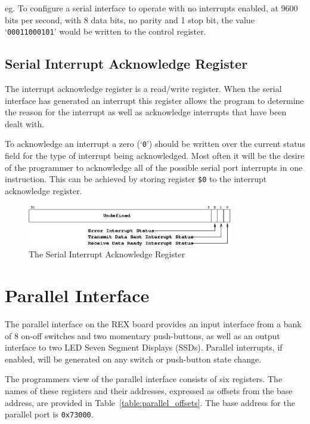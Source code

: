 \documentclass[a4paper,10pt]{article}
\begin{document}
\noindent
eg. To configure a serial interface to operate with no interrupts
enabled, at 9600 bits per second, with 8 data bits, no parity and 1
stop bit, the value `\texttt{00011000101}' would be written to the
control register.

\subsection{Serial Interrupt Acknowledge Register}

The interrupt acknowledge register is a read/write register. When the
serial interface has generated an interrupt this register allows the
program to determine the reason for the interrupt as well as
acknowledge interrupts that have been dealt with.

To acknowledge an interrupt a zero (`\texttt{0}') should be written
over the current status field for the type of interrupt being
acknowledged. Most often it will be the desire of the programmer to
acknowledge all of the possible serial port interrupts in one
instruction. This can be achieved by storing register \texttt{\$0} to
the interrupt acknowledge register.

\begin{figure}[h]
\begin{center}
\includegraphics[width=0.8\textwidth]{serial_iack.eps}
\caption{The Serial Interrupt Acknowledge Register}
\label{serial_iack_pic}
\end{center}
\end{figure}

\clearpage
\newpage
\section{Parallel Interface}
\label{appen:parallel}
The parallel interface on the REX board provides an input interface
from a bank of 8 on-off switches and two momentary push-buttons, as
well as an output interface to two LED Seven Segment Displays (SSDs).
Parallel interrupts, if enabled, will be generated on any switch or
push-button state change.

The programmers view of the parallel interface consists of six
registers.  The names of these registers and their addresses,
expressed as offsets from the base address, are provided in
Table~\ref{table:parallel_offsets}. The base address for the parallel
port is \texttt{0x73000}.
\end{document}
